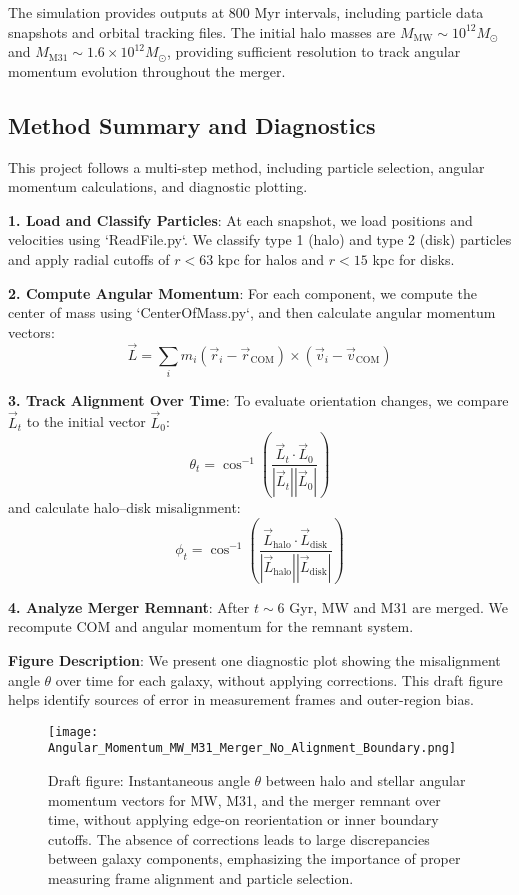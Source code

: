 \documentclass[twocolumn]{aastex631}
\begin{document}
The simulation provides outputs at 800 Myr intervals, including particle data snapshots and orbital tracking files. The initial halo masses are $M_{\text{MW}} \sim 10^{12} M_\odot$ and $M_{\text{M31}} \sim 1.6 \times 10^{12} M_\odot$, providing sufficient resolution to track angular momentum evolution throughout the merger.


\subsection{Method Summary and Diagnostics}

This project follows a multi-step method, including particle selection, angular momentum calculations, and diagnostic plotting.

\textbf{1. Load and Classify Particles}: At each snapshot, we load positions and velocities using `ReadFile.py`. We classify type 1 (halo) and type 2 (disk) particles and apply radial cutoffs of $r < 63$ kpc for halos and $r < 15$ kpc for disks.

\textbf{2. Compute Angular Momentum}: For each component, we compute the center of mass using `CenterOfMass.py`, and then calculate angular momentum vectors:
\[
\vec{L} = \sum_i m_i (\vec{r}_i - \vec{r}_{\text{COM}}) \times (\vec{v}_i - \vec{v}_{\text{COM}})
\]

\textbf{3. Track Alignment Over Time}: To evaluate orientation changes, we compare $\vec{L}_t$ to the initial vector $\vec{L}_0$:
\[
\theta_t = \cos^{-1}\left( \frac{ \vec{L}_t \cdot \vec{L}_0 }{ |\vec{L}_t||\vec{L}_0| } \right)
\]
and calculate halo–disk misalignment:
\[
\phi_t = \cos^{-1}\left( \frac{ \vec{L}_\text{halo} \cdot \vec{L}_\text{disk} }{ |\vec{L}_\text{halo}||\vec{L}_\text{disk}| } \right)
\]

\textbf{4. Analyze Merger Remnant}: After $t \sim 6$ Gyr, MW and M31 are merged. We recompute COM and angular momentum for the remnant system.

\textbf{Figure Description}: We present one diagnostic plot showing the misalignment angle $\theta$ over time for each galaxy, without applying corrections. This draft figure helps identify sources of error in measurement frames and outer-region bias.

\begin{figure}[H]
    \centering
    \texttt{[image: Angular\_Momentum\_MW\_M31\_Merger\_No\_Alignment\_Boundary.png]}
    \caption{Draft figure: Instantaneous angle $\theta$ between halo and stellar angular momentum vectors for MW, M31, and the merger remnant over time, without applying edge-on reorientation or inner boundary cutoffs. The absence of corrections leads to large discrepancies between galaxy components, emphasizing the importance of proper measuring frame alignment and particle selection.}
    \label{fig:draft_halo_disk_angle}
\end{figure}
\end{document}
